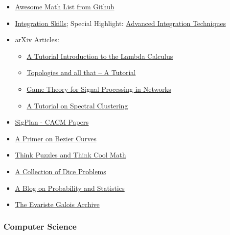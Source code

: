 \begin{itemize}

	\item \href{https://github.com/rossant/awesome-math}{Awesome Math List from Github}

	\item \href{http://math.stackexchange.com/questions/765198/some-users-are-mind-bogglingly-skilled-at-integration-how-did-they-get-there/1063528\#1063528}{Integration
	Skills}; Special Highlight: \href{http://faculty.swosu.edu/michael.dougherty/book/chapter07.pdf}{Advanced
	Integration Techniques}

	\item arXiv Articles:

	\begin{itemize}
		\item \href{http://arxiv.org/abs/1503.09060}{A Tutorial Introduction to
			the Lambda Calculus}
		\item \href{http://arxiv.org/abs/1503.00875}{Topologies and all that -- A
			Tutorial}
		\item \href{http://arxiv.org/abs/1506.00982}{Game Theory for Signal
			Processing in Networks}
		\item \href{http://arxiv.org/abs/0711.0189}{A Tutorial on Spectral
			Clustering}
	\end{itemize}

	\item \href{http://www.sigplan.org/Newsletters/CACM/Papers/}{SigPlan - CACM Papers}

	\item \href{https://pomax.github.io/bezierinfo/}{A Primer on Bezier Curves}

	\item \href{http://www.jamestanton.com/?category_name=puzzles}{Think Puzzles and Think Cool Math}

	\item \href{dice1.pdf}{A Collection of Dice Problems}

	\item \href{https://probabilityandstats.wordpress.com/}{A Blog on
	Probability and Statistics}

	\item  \href{http://www.galois-group.net/g/EN/theory.html}{The Evariste Galois Archive}

\end{itemize}

\subsubsection{Computer Science}

